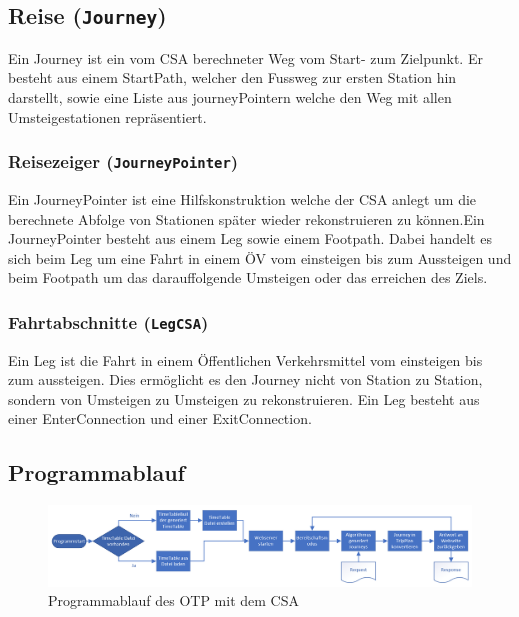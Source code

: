 \subsection{Reise (\texttt{Journey})}
Ein Journey ist ein vom CSA berechneter Weg vom Start- zum Zielpunkt. Er besteht aus einem StartPath, welcher den Fussweg zur ersten Station hin darstellt, sowie eine Liste aus journeyPointern welche den Weg mit allen Umsteigestationen repräsentiert. 

\subsubsection{Reisezeiger (\texttt{JourneyPointer})}
Ein JourneyPointer ist eine Hilfskonstruktion welche der CSA anlegt um die berechnete Abfolge von Stationen später wieder rekonstruieren zu können.Ein JourneyPointer besteht aus einem Leg sowie einem Footpath. Dabei handelt es sich beim Leg um eine Fahrt in einem ÖV vom einsteigen bis zum Aussteigen und beim Footpath um das darauffolgende Umsteigen oder das erreichen des Ziels.

\subsubsection{Fahrtabschnitte (\texttt{LegCSA})}
Ein Leg ist die Fahrt in einem Öffentlichen Verkehrsmittel vom einsteigen bis zum aussteigen. Dies ermöglicht es den Journey nicht von Station zu Station, sondern von Umsteigen zu Umsteigen zu rekonstruieren. Ein Leg besteht aus einer EnterConnection und einer ExitConnection. 

\subsection{Programmablauf}
\begin{figure}[htb]
	\centering
	\includegraphics[width=15cm]{img/programmablauf.png}
	\caption{Programmablauf des OTP mit dem CSA}
	\label{fig:programmablauf}
\end{figure}

